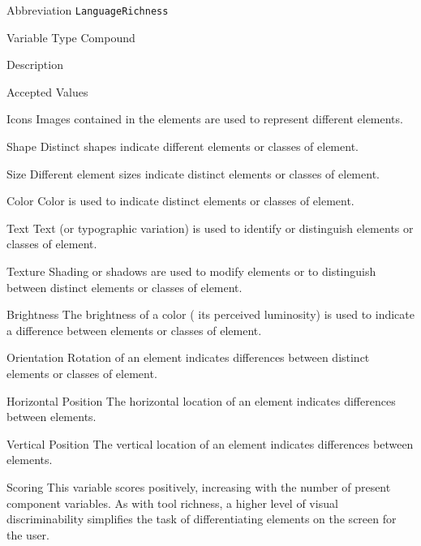 \begin{AlignedDesc}
  \item[Abbreviation] \texttt{LanguageRichness}

  \item[Variable Type] Compound

  \item[Description]

  \item[Accepted Values]

  \begin{AlignedDesc}
    \item[Icons] Images contained in the elements are used to represent
    different elements.~\cite{costagliola2002,moody2009}
    \item[Shape] Distinct shapes indicate different elements or classes of
    element.~\cite{moody2009}
    \item[Size] Different element sizes indicate distinct elements or
    classes of element.~\cite{moody2009}
    \item[Color] Color is used to indicate distinct elements or classes of
    element.~\cite{moody2009}
    \item[Text] Text (or typographic variation) is used to identify or
    distinguish elements or classes of element.~\cite{moody2009}
    \item[Texture] Shading or shadows are used to modify elements or to
    distinguish between distinct elements or classes of
    element.~\cite{moody2009}
    \item[Brightness] The brightness of a color (\ie{} its perceived
    luminosity) is used to indicate a difference between elements or
    classes of element.~\cite{moody2009}
    \item[Orientation] Rotation of an element indicates differences between
    distinct elements or classes of element.~\cite{moody2009}
    \item[Horizontal Position] The horizontal location of an element
    indicates differences between elements.~\cite{moody2009}
    \item[Vertical Position] The vertical location of an element
    indicates differences between elements.~\cite{moody2009}
  \end{AlignedDesc}

  \item[Scoring] This variable scores positively, increasing with the
  number of present component variables. As with tool richness, a higher
  level of visual discriminability simplifies the task of differentiating
  elements on the screen for the user.
\end{AlignedDesc}


